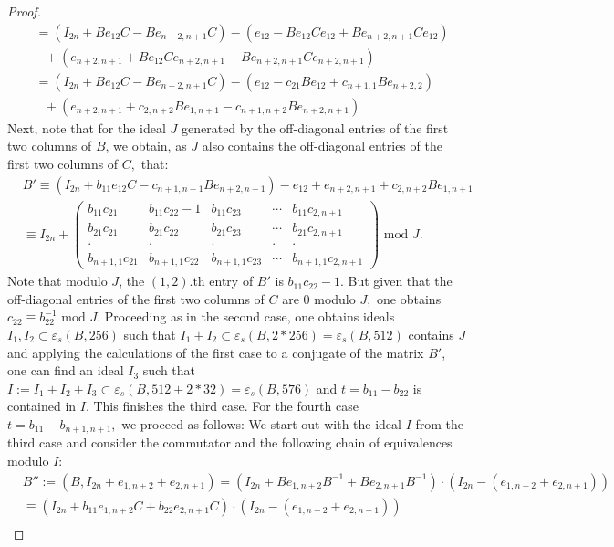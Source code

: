 \documentclass[12pt]{amsart}
\theoremstyle{definition}\newtheorem{definition}[theorem]{Definition}
\theoremstyle{remark}\newtheorem{remark}[theorem]{Remark}
\theoremstyle{definition}\newtheorem{case}{Case}
\begin{document}
\begin{proof}
\begin{align*}
&=(I_{2n}+Be_{12}C-Be_{n+2,n+1}C)-(e_{12}-Be_{12}Ce_{12}+Be_{n+2,n+1}Ce_{12})\\
&\ \ \ +(e_{n+2,n+1}+Be_{12}Ce_{n+2,n+1}-Be_{n+2,n+1}Ce_{n+2,n+1})\\
&=(I_{2n}+Be_{12}C-Be_{n+2,n+1}C)-(e_{12}-c_{21}Be_{12}+c_{n+1,1}Be_{n+2,2})\\
&\ \ \ +(e_{n+2,n+1}+c_{2,n+2}Be_{1,n+1}-c_{n+1,n+2}Be_{n+2,n+1})
\end{align*}
Next, note that for the ideal $J$ generated by the off-diagonal entries of the first two columns of $B$, we obtain, as $J$ also contains the off-diagonal entries of the first two columns of $C,$ that:
\begin{align*}
&B'\equiv (I_{2n}+b_{11}e_{12}C-c_{n+1,n+1}Be_{n+2,n+1})-e_{12}+e_{n+2,n+1}+c_{2,n+2}Be_{1,n+1}\\
&\equiv I_{2n}+
\begin{pmatrix}
b_{11}c_{21} & b_{11}c_{22}-1 & b_{11}c_{23} & \cdots & b_{11}c_{2,n+1}\\
b_{21}c_{21} & b_{21}c_{22} & b_{21}c_{23} & \cdots & b_{21}c_{2,n+1}\\
\cdot & \cdot & \cdot & \cdot & \cdot\\
b_{n+1,1}c_{21} & b_{n+1,1}c_{22} & b_{n+1,1}c_{23} & \cdots & b_{n+1,1}c_{2,n+1}
\end{pmatrix}\text{ mod }J.
\end{align*}
Note that modulo $J$, the $(1,2).$th entry of $B'$ is $b_{11}c_{22}-1.$ But given that the off-diagonal entries of the first two columns of $C$ are $0$ modulo $J,$ one obtains $c_{22}\equiv b_{22}^{-1}\text{ mod }J$. Proceeding as in the second case, one obtains ideals $I_1,I_2\subset\varepsilon_s(B,256)$ such that $I_1+I_2\subset\varepsilon_s(B,2*256)=\varepsilon_s(B,512)$ contains $J$ and applying the calculations of the first case to a conjugate of the matrix $B'$, one can find an ideal $I_3$ such that $I:=I_1+I_2+I_3\subset\varepsilon_s(B,512+2*32)=\varepsilon_s(B,576)$ and $t=b_{11}-b_{22}$ is contained in $I.$ This finishes the third case. For the fourth case $t=b_{11}-b_{n+1,n+1},$ we proceed as follows: We start out with the ideal $I$ from the third case and consider the commutator and the following chain of equivalences modulo $I:$
\begin{align*}
&B'':=(B,I_{2n}+e_{1,n+2}+e_{2,n+1})=
(I_{2n}+Be_{1,n+2}B^{-1}+Be_{2,n+1}B^{-1})\cdot(I_{2n}-(e_{1,n+2}+e_{2,n+1}))\\
&\equiv (I_{2n}+b_{11}e_{1,n+2}C+b_{22}e_{2,n+1}C)\cdot (I_{2n}-(e_{1,n+2}+e_{2,n+1}))\\

\end{align*}
\end{proof}
\end{document}
